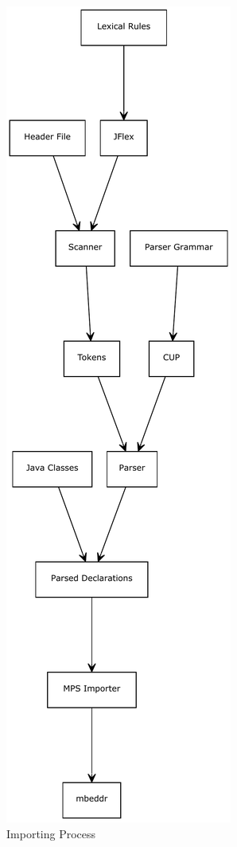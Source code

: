 \documentclass[titlepage]{article}
\begin{document}
\begin{center}

\begin{figure}[htbp]
\centering
\caption{Importing Process}

\includegraphics[scale=0.4]{process.pdf}

\end{figure}
\end{center}
\end{document}
